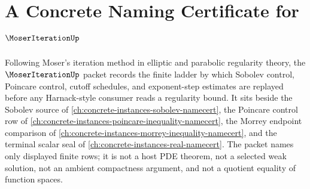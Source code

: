 \chapter{A Concrete Naming Certificate for $\MoserIterationUp$}
\label{ch:concrete-instances-moser-iteration-namecert}

Following Moser's iteration method in elliptic and parabolic regularity theory, the $\MoserIterationUp$ packet records the finite ladder by which Sobolev control, Poincare control, cutoff schedules, and exponent-step estimates are replayed before any Harnack-style consumer reads a regularity bound. It sits beside the Sobolev source of \autoref{ch:concrete-instances-sobolev-namecert}, the Poincare control row of \autoref{ch:concrete-instances-poincare-inequality-namecert}, the Morrey endpoint comparison of \autoref{ch:concrete-instances-morrey-inequality-namecert}, and the terminal scalar seal of \autoref{ch:concrete-instances-real-namecert}. The packet names only displayed finite rows; it is not a host PDE theorem, not a selected weak solution, not an ambient compactness argument, and not a quotient equality of function spaces.

